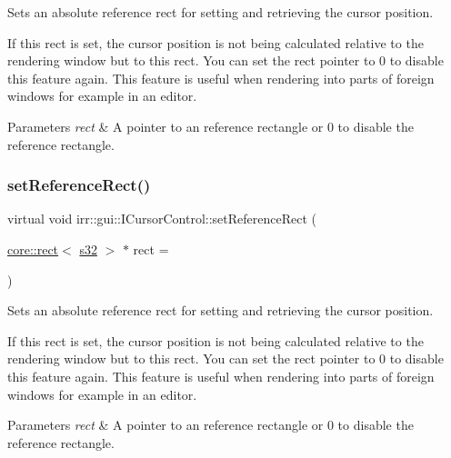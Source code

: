 Sets an absolute reference rect for setting and retrieving the cursor position. 

If this rect is set, the cursor position is not being calculated relative to the rendering window but to this rect. You can set the rect pointer to 0 to disable this feature again. This feature is useful when rendering into parts of foreign windows for example in an editor. 
\begin{DoxyParams}{Parameters}
{\em rect} & A pointer to an reference rectangle or 0 to disable the reference rectangle. \\
\hline
\end{DoxyParams}
\mbox{\label{classirr_1_1gui_1_1ICursorControl_a2a7428ef716a60f8f4b86361a69b8770}} 
\subsubsection{\texorpdfstring{set\+Reference\+Rect()}{setReferenceRect()}\hspace{0.1cm}{\footnotesize\ttfamily [2/2]}}
{\footnotesize\ttfamily virtual void irr\+::gui\+::\+I\+Cursor\+Control\+::set\+Reference\+Rect (\begin{DoxyParamCaption}\item[{\hyperlink{classirr_1_1core_1_1rect}{core\+::rect}$<$ \hyperlink{namespaceirr_ac66849b7a6ed16e30ebede579f9b47c6}{s32} $>$ $\ast$}]{rect = {} }\end{DoxyParamCaption})\hspace{0.3cm}{\ttfamily [pure virtual]}}



Sets an absolute reference rect for setting and retrieving the cursor position. 

If this rect is set, the cursor position is not being calculated relative to the rendering window but to this rect. You can set the rect pointer to 0 to disable this feature again. This feature is useful when rendering into parts of foreign windows for example in an editor. 
\begin{DoxyParams}{Parameters}
{\em rect} & A pointer to an reference rectangle or 0 to disable the reference rectangle. \\
\hline
\end{DoxyParams}
\mbox{\label{classirr_1_1gui_1_1ICursorControl_aceb41d68494e2b2076fbc6949b254c74}} 
